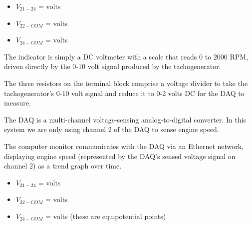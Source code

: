 \begin{itemize}
\item{} $V_{21-24}$ = \underbar{\hskip 50pt} volts
\vskip 5pt
\item{} $V_{22-COM}$ = \underbar{\hskip 50pt} volts
\vskip 5pt
\item{} $V_{24-COM}$ = \underbar{\hskip 50pt} volts
\end{itemize}














The indicator is simply a DC voltmeter with a scale that reads 0 to 2000 RPM, driven directly by the 0-10 volt signal produced by the tachogenerator.

\vskip 10pt

The three resistors on the terminal block comprise a voltage divider to take the tachogenerator's 0-10 volt signal and reduce it to 0-2 volts DC for the DAQ to measure.

\vskip 10pt

The DAQ is a multi-channel voltage-sensing analog-to-digital converter.  In this system we are only using channel 2 of the DAQ to sense engine speed.

\vskip 10pt

The computer monitor communicates with the DAQ via an Ethernet network, displaying engine speed (represented by the DAQ's sensed voltage signal on channel 2) as a trend graph over time.

\begin{itemize}
\item{} $V_{21-24}$ =  volts
\vskip 5pt
\item{} $V_{22-COM}$ =  volts
\vskip 5pt
\item{} $V_{24-COM}$ =  volts (these are equipotential points)
\end{itemize}




